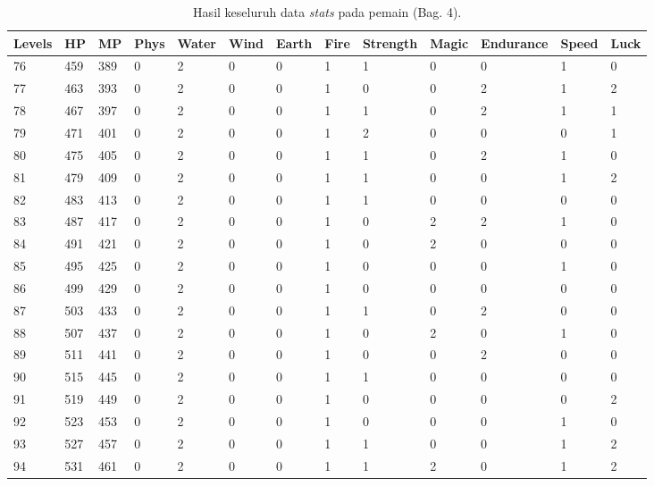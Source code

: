 \begin{sidewaystable}[!h]
	\centering
	\caption{Hasil keseluruh data \textit{stats} pada pemain (Bag. 4).}
	\label{tb:player_all_stats_4}
	\vspace{1ex}
		\begin{tabular}{|l|l|l|l|l|l|l|l|l|l|l|l|l|}
			\hline
			\rowcolor[HTML]{C0C0C0} 
			\textbf{Levels} & \textbf{HP} & \textbf{MP} & \textbf{Phys} & \textbf{Water} & \textbf{Wind} & \textbf{Earth} & \textbf{Fire} & \textbf{Strength} & \textbf{Magic} & \textbf{Endurance} & \textbf{Speed} & \textbf{Luck} \\ \hline	
			76 & 459 & 389 & 0 & 2 & 0 & 0 & 1 & 1 & 0 & 0 & 1 & 0 \\ \hline
			77 & 463 & 393 & 0 & 2 & 0 & 0 & 1 & 0 & 0 & 2 & 1 & 2 \\ \hline
			78 & 467 & 397 & 0 & 2 & 0 & 0 & 1 & 1 & 0 & 2 & 1 & 1 \\ \hline
			79 & 471 & 401 & 0 & 2 & 0 & 0 & 1 & 2 & 0 & 0 & 0 & 1 \\ \hline
			80 & 475 & 405 & 0 & 2 & 0 & 0 & 1 & 1 & 0 & 2 & 1 & 0 \\ \hline
			81 & 479 & 409 & 0 & 2 & 0 & 0 & 1 & 1 & 0 & 0 & 1 & 2 \\ \hline
			82 & 483 & 413 & 0 & 2 & 0 & 0 & 1 & 1 & 0 & 0 & 0 & 0 \\ \hline
			83 & 487 & 417 & 0 & 2 & 0 & 0 & 1 & 0 & 2 & 2 & 1 & 0 \\ \hline
			84 & 491 & 421 & 0 & 2 & 0 & 0 & 1 & 0 & 2 & 0 & 0 & 0 \\ \hline
			85 & 495 & 425 & 0 & 2 & 0 & 0 & 1 & 0 & 0 & 0 & 1 & 0 \\ \hline
			86 & 499 & 429 & 0 & 2 & 0 & 0 & 1 & 0 & 0 & 0 & 0 & 0 \\ \hline
			87 & 503 & 433 & 0 & 2 & 0 & 0 & 1 & 1 & 0 & 2 & 0 & 0 \\ \hline
			88 & 507 & 437 & 0 & 2 & 0 & 0 & 1 & 0 & 2 & 0 & 1 & 0 \\ \hline
			89 & 511 & 441 & 0 & 2 & 0 & 0 & 1 & 0 & 0 & 2 & 0 & 0 \\ \hline
			90 & 515 & 445 & 0 & 2 & 0 & 0 & 1 & 1 & 0 & 0 & 0 & 0 \\ \hline
			91 & 519 & 449 & 0 & 2 & 0 & 0 & 1 & 0 & 0 & 0 & 0 & 2 \\ \hline
			92 & 523 & 453 & 0 & 2 & 0 & 0 & 1 & 0 & 0 & 0 & 1 & 0 \\ \hline
			93 & 527 & 457 & 0 & 2 & 0 & 0 & 1 & 1 & 0 & 0 & 1 & 2 \\ \hline
			94 & 531 & 461 & 0 & 2 & 0 & 0 & 1 & 1 & 2 & 0 & 1 & 2 \\ \hline

\end{tabular}
\end{sidewaystable}
